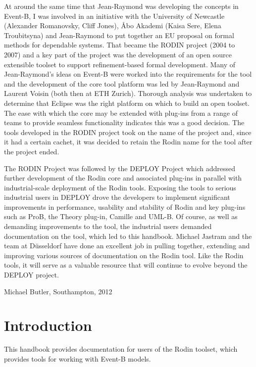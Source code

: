\documentclass[12pt]{book}
\begin{document}
At around the same time that Jean-Raymond was developing the concepts in Event-B, I was involved in an initiative with the University of Newcastle (Alexander Romanovsky, Cliff Jones), {\AA}bo Akademi  (Kaisa Sere, Elena Troubitsyna) and Jean-Raymond to put together an EU proposal on formal methods for dependable systems.  That became the RODIN project (2004 to 2007) and a key part of the project was the development of an open source extensible toolset to support refinement-based formal development.  Many of Jean-Raymond’s ideas on Event-B were worked into the requirements for the tool and the development of the core tool platform was led by Jean-Raymond and Laurent Voisin (both then at ETH Zurich). Thorough analysis was undertaken to determine that Eclipse was the right platform on which to build an open toolset.  The ease with which the core may be extended with plug-ins from a range of teams to provide seamless functionality indicates this was a good decision. The tools developed in the RODIN project took on the name of the project and, since it had a certain cachet, it was decided to retain the Rodin name for the tool after the project ended.

The RODIN Project was followed by the DEPLOY Project which addressed further development of the Rodin core and associated plug-ins in parallel with industrial-scale deployment of the Rodin tools.  Exposing the tools to serious industrial users in DEPLOY drove the developers to implement significant improvements in performance, usability and stability of Rodin and key plug-ins such as ProB, the Theory plug-in, Camille and UML-B.  Of course, as well as demanding improvements to the tool, the industrial users demanded documentation on the tool, which led to this handbook.  Michael Jastram and the team at D\"{u}sseldorf have done an excellent job in pulling together, extending and improving various sources of documentation on the Rodin tool.  Like the Rodin tools, it will serve as a valuable resource that will continue to evolve beyond the DEPLOY project.

\begin{flushright}Michael Butler, Southampton, 2012\end{flushright}

\chapter{Introduction}

This handbook provides documentation for users of the Rodin toolset, which provides tools for working with Event-B models.
\end{document}
